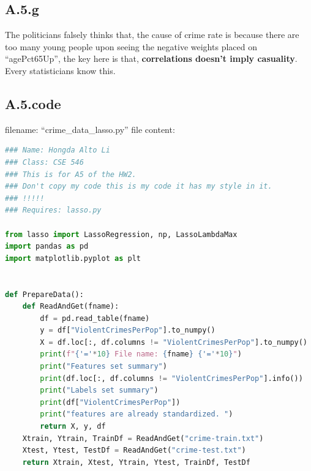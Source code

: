 \documentclass[]{article}
\begin{document}
    \subsection*{A.5.g}
        The politicians falsely thinks that, the cause of crime rate is because there are too many young people upon seeing the negative weights placed on ``agePct65Up'', the key here is that, \textbf{correlations doesn't imply casuality}. Every statisticians know this. 
    \subsection*{A.5.code}
        filename: ``crime\_data\_lasso.py''
        file content: 
        \begin{lstlisting}[language=python]
### Name: Hongda Alto Li
### Class: CSE 546
### This is for A5 of the HW2.
### Don't copy my code this is my code it has my style in it.
### !!!!!
### Requires: lasso.py

from lasso import LassoRegression, np, LassoLambdaMax
import pandas as pd
import matplotlib.pyplot as plt


def PrepareData():
    def ReadAndGet(fname):
        df = pd.read_table(fname)
        y = df["ViolentCrimesPerPop"].to_numpy()
        X = df.loc[:, df.columns != "ViolentCrimesPerPop"].to_numpy()
        print(f"{'='*10} File name: {fname} {'='*10}")
        print("Features set summary")
        print(df.loc[:, df.columns != "ViolentCrimesPerPop"].info())
        print("Labels set summary")
        print(df["ViolentCrimesPerPop"])
        print("features are already standardized. ")
        return X, y, df
    Xtrain, Ytrain, TrainDf = ReadAndGet("crime-train.txt")
    Xtest, Ytest, TestDf = ReadAndGet("crime-test.txt")
    return Xtrain, Xtest, Ytrain, Ytest, TrainDf, TestDf



\end{lstlisting}
\end{document}
